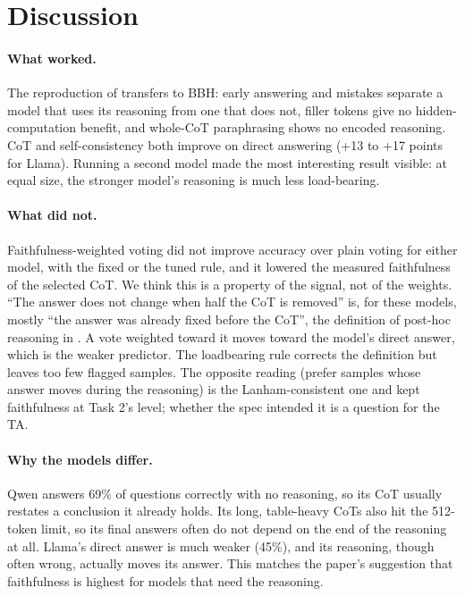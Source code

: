 \documentclass[11pt,a4paper]{article}
\begin{document}
\section{Discussion}
\paragraph{What worked.} The reproduction of \cite{lanham} transfers to BBH: early answering and mistakes separate a model
that uses its reasoning from one that does not, filler tokens give no hidden-computation benefit, and whole-CoT paraphrasing
shows no encoded reasoning. CoT and self-consistency both improve on direct answering (+13 to +17 points for Llama). Running
a second model made the most interesting result visible: at equal size, the stronger model's reasoning is much less
load-bearing.

\paragraph{What did not.} Faithfulness-weighted voting did not improve accuracy over plain voting for either model, with the
fixed or the tuned rule, and it lowered the measured faithfulness of the selected CoT. We think this is a property of the
signal, not of the weights. ``The answer does not change when half the CoT is removed'' is, for these models, mostly ``the
answer was already fixed before the CoT'', the definition of post-hoc reasoning in \cite{lanham}. A vote weighted toward it
moves toward the model's direct answer, which is the weaker predictor. The loadbearing rule corrects the definition but
leaves too few flagged samples. The opposite reading (prefer samples whose answer moves during the reasoning) is the
Lanham-consistent one and kept faithfulness at Task 2's level; whether the spec intended it is a question for the TA.

\paragraph{Why the models differ.} Qwen answers 69\% of questions correctly with no reasoning, so its CoT usually restates a
conclusion it already holds. Its long, table-heavy CoTs also hit the 512-token limit, so its final answers often do not
depend on the end of the reasoning at all. Llama's direct answer is much weaker (45\%), and its reasoning, though often
wrong, actually moves its answer. This matches the paper's suggestion that faithfulness is highest for models that need
the reasoning.
\end{document}
